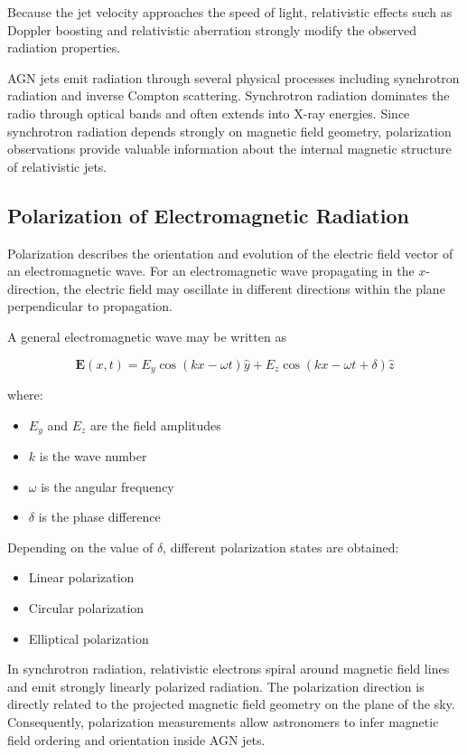 \documentclass{article}
\begin{document}
Because the jet velocity approaches the speed of light, relativistic effects such as Doppler boosting and relativistic aberration strongly modify the observed radiation properties.

AGN jets emit radiation through several physical processes including synchrotron radiation and inverse Compton scattering. Synchrotron radiation dominates the radio through optical bands and often extends into X-ray energies. Since synchrotron radiation depends strongly on magnetic field geometry, polarization observations provide valuable information about the internal magnetic structure of relativistic jets.

\subsection{Polarization of Electromagnetic Radiation}

Polarization describes the orientation and evolution of the electric field vector of an electromagnetic wave. For an electromagnetic wave propagating in the \(x\)-direction, the electric field may oscillate in different directions within the plane perpendicular to propagation.

A general electromagnetic wave may be written as

\begin{equation}
\mathbf{E}(x,t) =
E_y \cos(kx-\omega t)\hat{y}
+
E_z \cos(kx-\omega t+\delta)\hat{z}
\end{equation}

where:
\begin{itemize}
    \item \(E_y\) and \(E_z\) are the field amplitudes
    \item \(k\) is the wave number
    \item \(\omega\) is the angular frequency
    \item \(\delta\) is the phase difference
\end{itemize}

Depending on the value of \(\delta\), different polarization states are obtained:
\begin{itemize}
    \item Linear polarization
    \item Circular polarization
    \item Elliptical polarization
\end{itemize}

In synchrotron radiation, relativistic electrons spiral around magnetic field lines and emit strongly linearly polarized radiation. The polarization direction is directly related to the projected magnetic field geometry on the plane of the sky. Consequently, polarization measurements allow astronomers to infer magnetic field ordering and orientation inside AGN jets.
\end{document}

